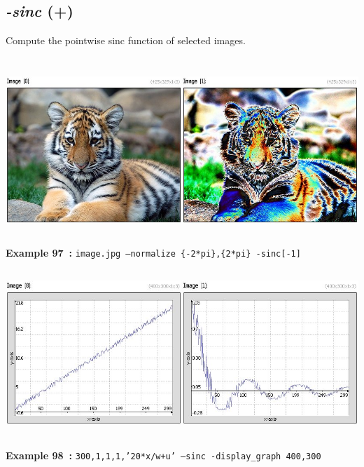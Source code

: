 \documentclass[a4paper,11pt,twoside]{book}
\begin{document}
\subsection{\emph{-sinc} (+)}\vspace*{-0.5em}
Compute the pointwise sinc function of selected images.
\begin{center}\includegraphics[keepaspectratio=true,height=7cm,width=\textwidth]{img/gmic_def97.jpg}\\
{\footnotesize \textbf{Example 97~:} \texttt{image.jpg --normalize \{-2*pi\},\{2*pi\} -sinc[-1]}}
\\\includegraphics[keepaspectratio=true,height=7cm,width=\textwidth]{img/gmic_def98.jpg}\\
{\footnotesize \textbf{Example 98~:} \texttt{300,1,1,1,'20*x/w+u' --sinc -display\_graph 400,300}}
\end{center}
\end{document}
